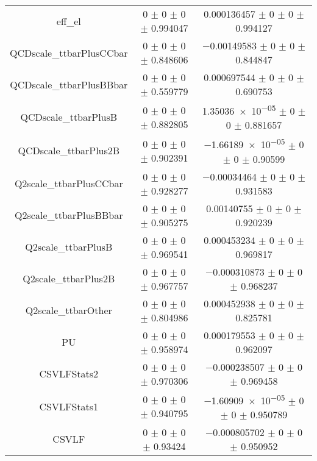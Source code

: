 \begin{table}
\begin{tabular}{ccc}
eff\_el & \num{0} $\pm$ \num{0} $\pm$ \num{0} $\pm$ \num{0.994047} & \num{0.000136457} $\pm$ \num{0} $\pm$ \num{0} $\pm$ \num{0.994127}\\
QCDscale\_ttbarPlusCCbar & \num{0} $\pm$ \num{0} $\pm$ \num{0} $\pm$ \num{0.848606} & \num{-0.00149583} $\pm$ \num{0} $\pm$ \num{0} $\pm$ \num{0.844847}\\
QCDscale\_ttbarPlusBBbar & \num{0} $\pm$ \num{0} $\pm$ \num{0} $\pm$ \num{0.559779} & \num{0.000697544} $\pm$ \num{0} $\pm$ \num{0} $\pm$ \num{0.690753}\\
QCDscale\_ttbarPlusB & \num{0} $\pm$ \num{0} $\pm$ \num{0} $\pm$ \num{0.882805} & \num{1.35036e-05} $\pm$ \num{0} $\pm$ \num{0} $\pm$ \num{0.881657}\\
QCDscale\_ttbarPlus2B & \num{0} $\pm$ \num{0} $\pm$ \num{0} $\pm$ \num{0.902391} & \num{-1.66189e-05} $\pm$ \num{0} $\pm$ \num{0} $\pm$ \num{0.90599}\\
Q2scale\_ttbarPlusCCbar & \num{0} $\pm$ \num{0} $\pm$ \num{0} $\pm$ \num{0.928277} & \num{-0.00034464} $\pm$ \num{0} $\pm$ \num{0} $\pm$ \num{0.931583}\\
Q2scale\_ttbarPlusBBbar & \num{0} $\pm$ \num{0} $\pm$ \num{0} $\pm$ \num{0.905275} & \num{0.00140755} $\pm$ \num{0} $\pm$ \num{0} $\pm$ \num{0.920239}\\
Q2scale\_ttbarPlusB & \num{0} $\pm$ \num{0} $\pm$ \num{0} $\pm$ \num{0.969541} & \num{0.000453234} $\pm$ \num{0} $\pm$ \num{0} $\pm$ \num{0.969817}\\
Q2scale\_ttbarPlus2B & \num{0} $\pm$ \num{0} $\pm$ \num{0} $\pm$ \num{0.967757} & \num{-0.000310873} $\pm$ \num{0} $\pm$ \num{0} $\pm$ \num{0.968237}\\
Q2scale\_ttbarOther & \num{0} $\pm$ \num{0} $\pm$ \num{0} $\pm$ \num{0.804986} & \num{0.000452938} $\pm$ \num{0} $\pm$ \num{0} $\pm$ \num{0.825781}\\
PU & \num{0} $\pm$ \num{0} $\pm$ \num{0} $\pm$ \num{0.958974} & \num{0.000179553} $\pm$ \num{0} $\pm$ \num{0} $\pm$ \num{0.962097}\\
CSVLFStats2 & \num{0} $\pm$ \num{0} $\pm$ \num{0} $\pm$ \num{0.970306} & \num{-0.000238507} $\pm$ \num{0} $\pm$ \num{0} $\pm$ \num{0.969458}\\
CSVLFStats1 & \num{0} $\pm$ \num{0} $\pm$ \num{0} $\pm$ \num{0.940795} & \num{-1.60909e-05} $\pm$ \num{0} $\pm$ \num{0} $\pm$ \num{0.950789}\\
CSVLF & \num{0} $\pm$ \num{0} $\pm$ \num{0} $\pm$ \num{0.93424} & \num{-0.000805702} $\pm$ \num{0} $\pm$ \num{0} $\pm$ \num{0.950952}\\

\end{tabular}
\end{table}
